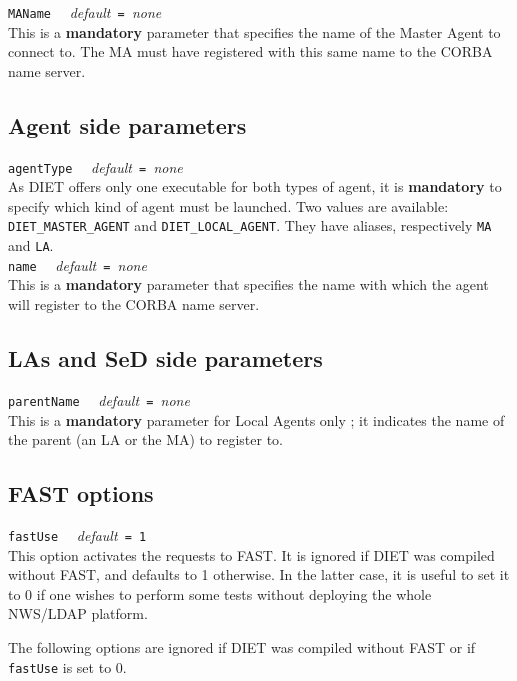 \noindent
\texttt{MAName} \ \ \emph{default}\texttt{ = }\emph{none}\\ This is a
\textbf{mandatory} parameter that specifies the name of the Master
Agent to connect to. The MA must have registered with this same name
to the CORBA name server.


\subsection{Agent side parameters}

\noindent
\texttt{agentType} \ \ \emph{default}\texttt{ = }\emph{none}\\
As DIET offers only one executable for both types of agent, it is
\textbf{mandatory} to specify which kind of agent must be launched. Two values
are available: \texttt{DIET\_MASTER\_AGENT} and \texttt{DIET\_LOCAL\_AGENT}.
They have aliases, respectively \texttt{MA} and \texttt{LA}.
\\

\noindent
\texttt{name} \ \ \emph{default}\texttt{ = }\emph{none}\\ This is a
\textbf{mandatory} parameter that specifies the name with which the
agent will register to the CORBA name server.


\subsection{LAs and SeD side parameters}

\noindent
\texttt{parentName} \ \ \emph{default}\texttt{ = }\emph{none}\\ This
is a \textbf{mandatory} parameter for Local Agents only ; it indicates
the name of the parent (an LA or the MA) to register to.


\subsection{FAST options}

\noindent
\texttt{fastUse} \ \ \emph{default}\texttt{ = 1}\\ This option
activates the requests to FAST. It is ignored if DIET was compiled
without FAST, and defaults to 1 otherwise. In the latter case, it is
useful to set it to 0 if one wishes to perform some tests without
deploying the whole NWS/LDAP platform.

The following options are ignored if DIET was compiled without FAST or if
\texttt{fastUse} is set to 0.


